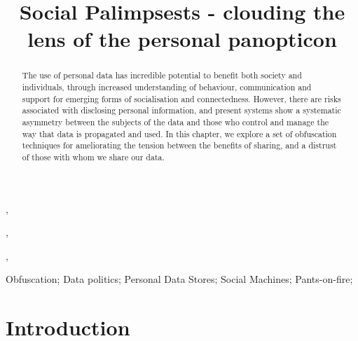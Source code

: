 \documentclass{IOS-Book-Article}     %
\begin{document}
\begin{frontmatter}          %
%
\title{Social Palimpsests - clouding the lens of the personal panopticon}



\author[A]{ },
\author[B]{ },
\author[B]{ },
\author[B]{ }

\address[A]{Centre for Intelligent Systems and Applications,
Department of Informatics, University of Edinburgh}
\address[B]{Web and Internet Science Research Group, Electronics and Computer Science, University of Southampton}

\begin{abstract}
The use of personal data has incredible potential to benefit both society and
individuals, through increased understanding of behaviour, communication and
support for emerging forms of socialisation and connectedness. However, there
are risks associated with disclosing personal information, and present systems
show a systematic asymmetry between the subjects of the data and those who
control and manage the way that data is propagated and used. In this chapter, we
explore a set of obfuscation techniques for ameliorating the tension between
the benefits of sharing, and a distrust of those with whom we share our data.
\end{abstract}

\begin{keyword}
Obfuscation; Data politics; Personal Data Stores; Social Machines; Pants-on-fire;
\end{keyword}

\end{frontmatter}


\section*{Introduction}

\end{document}
